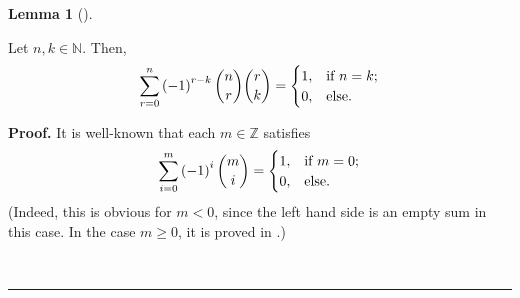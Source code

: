 \documentclass[numbers=enddot,12pt,final,onecolumn,notitlepage]{scrartcl}%
\numberwithin{exer}{subsection}
\theoremstyle{definition}
\newtheorem{lem}[theo]{Lemma}
\newenvironment{lemma}[1][]
{\begin{lem}[#1]\begin{leftbar}}
{\end{leftbar}\end{lem}}
\newenvironment{proof}[1][Proof]{\noindent\textbf{#1.} }{\ \rule{0.5em}{0.5em}}
\let\sumnonlimits\sum
\renewcommand{\sum}{\sumnonlimits\limits}
\begin{document}
\begin{lemma}
\label{lem.Nabla.prod0.bn}Let $n,k\in\mathbb{N}$. Then,%
\[
\sum_{r=0}^{n}\left(  -1\right)  ^{r-k}\dbinom{n}{r}\dbinom{r}{k}=%
\begin{cases}
1, & \text{if }n=k;\\
0, & \text{else.}%
\end{cases}
\]

\end{lemma}

\begin{proof}
It is well-known that each $m\in\mathbb{Z}$ satisfies%
\begin{equation}
\sum_{i=0}^{m}\left(  -1\right)  ^{i}\dbinom{m}{i}=%
\begin{cases}
1, & \text{if }m=0;\\
0, & \text{else.}%
\end{cases}
\label{pf.lem.Nabla.prod0.bn.sum-1}%
\end{equation}
(Indeed, this is obvious for $m<0$, since the left hand side is an empty sum
in this case. In the case $m\geq0$, it is proved in \cite[Proposition
1.3.28]{19fco}.)


\end{proof}
\end{document}
